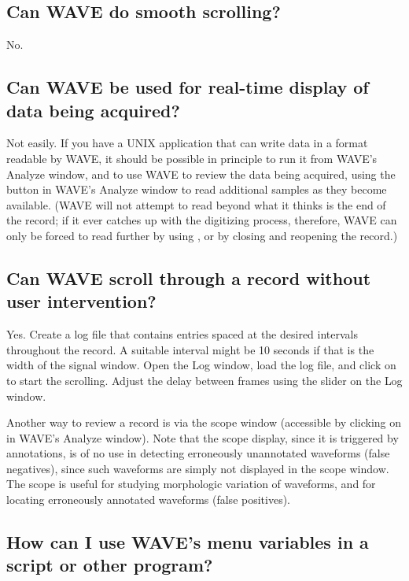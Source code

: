 \documentclass[twoside]{book}
\newcommand{\button}[1]{\cornersize{2}\ovalbox{\rule[-.3mm]{0cm}{2.5mm}\small\sf ~#1~}}
\newcommand{\WAVE}{{\sf WAVE}\xspace}
\begin{document}
\subsection{Can \WAVE{} do smooth scrolling?}

No.

\subsection{Can \WAVE{} be used for real-time display of data being acquired?}

Not easily.  If you have a UNIX application that can write data in a
format readable by \WAVE{}, it should be possible in principle to run it
from \WAVE{}'s {\sf Analyze} window, and to use \WAVE{} to review the data
being acquired, using the \button{Reload} button in \WAVE{}'s {\sf
Analyze} window to read additional samples as they become available.
(\WAVE{} will not attempt to read beyond what it thinks is the end of the
record; if it ever catches up with the digitizing process, therefore,
\WAVE{} can only be forced to read further by using \button{Reload},
or by closing and reopening the record.)

\subsection{Can \WAVE{} scroll through a record without user intervention?}

\label{sec:autoscroll}
Yes.  Create a log file that contains entries spaced at the desired
intervals throughout the record.  A suitable interval might be 10
seconds if that is the width of the signal window.  Open the {\sf Log}
window, load the log file, and click on \button{\tt >>} to start the
scrolling.  Adjust the delay between frames using the slider on the
{\sf Log} window.

Another way to review a record is via the scope window (accessible by
clicking on \button{Show scope window} in \WAVE{}'s {\sf Analyze}
window).  Note that the scope display, since it is triggered by
annotations, is of no use in detecting erroneously unannotated
waveforms (false negatives), since such waveforms are simply not
displayed in the scope window.  The scope is useful for studying
morphologic variation of waveforms, and for locating erroneously
annotated waveforms (false positives).

\subsection{How can I use \WAVE{}'s menu variables in a script or other program?}
\end{document}
